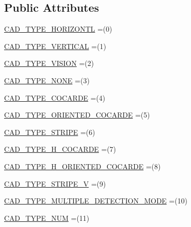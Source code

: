\subsection*{Public Attributes}
\begin{DoxyCompactItemize}
\item 
\hyperlink{enumworkspace_1_1_a_r_drone_nav_data_1_1src_1_1controller_1_1_vision_tag_1_1_vision_tag_type_a60eb4abf00641492c9290ab815a12d83}{C\+A\+D\+\_\+\+T\+Y\+P\+E\+\_\+\+H\+O\+R\+I\+Z\+O\+N\+T\+L} =(0)
\item 
\hyperlink{enumworkspace_1_1_a_r_drone_nav_data_1_1src_1_1controller_1_1_vision_tag_1_1_vision_tag_type_a0464f384da4f06cc12a6c7174462870d}{C\+A\+D\+\_\+\+T\+Y\+P\+E\+\_\+\+V\+E\+R\+T\+I\+C\+A\+L} =(1)
\item 
\hyperlink{enumworkspace_1_1_a_r_drone_nav_data_1_1src_1_1controller_1_1_vision_tag_1_1_vision_tag_type_a6cc20f5039f234ad0d6759fb42610635}{C\+A\+D\+\_\+\+T\+Y\+P\+E\+\_\+\+V\+I\+S\+I\+O\+N} =(2)
\item 
\hyperlink{enumworkspace_1_1_a_r_drone_nav_data_1_1src_1_1controller_1_1_vision_tag_1_1_vision_tag_type_acfc23f31371bb8ad235a943f1397b1b9}{C\+A\+D\+\_\+\+T\+Y\+P\+E\+\_\+\+N\+O\+N\+E} =(3)
\item 
\hyperlink{enumworkspace_1_1_a_r_drone_nav_data_1_1src_1_1controller_1_1_vision_tag_1_1_vision_tag_type_a4432e81a6b4667a07cba9fe802f096c2}{C\+A\+D\+\_\+\+T\+Y\+P\+E\+\_\+\+C\+O\+C\+A\+R\+D\+E} =(4)
\item 
\hyperlink{enumworkspace_1_1_a_r_drone_nav_data_1_1src_1_1controller_1_1_vision_tag_1_1_vision_tag_type_a62f1935ce82a27691ea413ca8f0f2bca}{C\+A\+D\+\_\+\+T\+Y\+P\+E\+\_\+\+O\+R\+I\+E\+N\+T\+E\+D\+\_\+\+C\+O\+C\+A\+R\+D\+E} =(5)
\item 
\hyperlink{enumworkspace_1_1_a_r_drone_nav_data_1_1src_1_1controller_1_1_vision_tag_1_1_vision_tag_type_a3811228ba6ce75ef1f8508240056df5e}{C\+A\+D\+\_\+\+T\+Y\+P\+E\+\_\+\+S\+T\+R\+I\+P\+E} =(6)
\item 
\hyperlink{enumworkspace_1_1_a_r_drone_nav_data_1_1src_1_1controller_1_1_vision_tag_1_1_vision_tag_type_ae9290eb7796785974a1620e73fa6b833}{C\+A\+D\+\_\+\+T\+Y\+P\+E\+\_\+\+H\+\_\+\+C\+O\+C\+A\+R\+D\+E} =(7)
\item 
\hyperlink{enumworkspace_1_1_a_r_drone_nav_data_1_1src_1_1controller_1_1_vision_tag_1_1_vision_tag_type_a9d4c4d9ed65610fe2c42f9c896588b12}{C\+A\+D\+\_\+\+T\+Y\+P\+E\+\_\+\+H\+\_\+\+O\+R\+I\+E\+N\+T\+E\+D\+\_\+\+C\+O\+C\+A\+R\+D\+E} =(8)
\item 
\hyperlink{enumworkspace_1_1_a_r_drone_nav_data_1_1src_1_1controller_1_1_vision_tag_1_1_vision_tag_type_abcd3997ce824e85268d0e1aeb09cc6f7}{C\+A\+D\+\_\+\+T\+Y\+P\+E\+\_\+\+S\+T\+R\+I\+P\+E\+\_\+\+V} =(9)
\item 
\hyperlink{enumworkspace_1_1_a_r_drone_nav_data_1_1src_1_1controller_1_1_vision_tag_1_1_vision_tag_type_aa30facc02f1da487ef34f3da40fe8730}{C\+A\+D\+\_\+\+T\+Y\+P\+E\+\_\+\+M\+U\+L\+T\+I\+P\+L\+E\+\_\+\+D\+E\+T\+E\+C\+T\+I\+O\+N\+\_\+\+M\+O\+D\+E} =(10)
\item 
\hyperlink{enumworkspace_1_1_a_r_drone_nav_data_1_1src_1_1controller_1_1_vision_tag_1_1_vision_tag_type_adc9d19727873ae1841d93cc4d5af866d}{C\+A\+D\+\_\+\+T\+Y\+P\+E\+\_\+\+N\+U\+M} =(11)
\end{DoxyCompactItemize}
